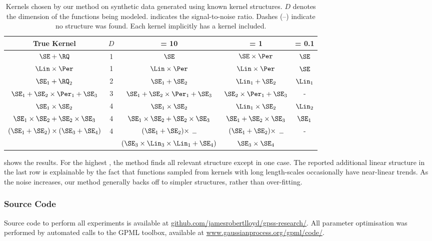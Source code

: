\begin{table}[ht!]
\caption[Kernels recovered on synthetic data]
{
Kernels chosen by our method on synthetic data generated using known kernel structures. $D$ denotes the dimension of the functions being modeled.
\SNR{} indicates the signal-to-noise ratio.
Dashes (--) indicate no structure was found.
Each kernel implicitly has a \kWN{} kernel included.
}
\label{tbl:synthetic}
\begin{center}
{\small
\begin{tabular}{c c | c c c}
True Kernel & $D$ & \SNR{} = 10 & \SNR{} = 1 & \hspace{-1cm} \SNR{} = 0.1 \\
\hline
$\SE + \RQ$        & 1 & $\SE$ & $\SE \times \Per$ & $\SE$ \\
$\Lin \times \Per$ & 1 & $\Lin \times \Per$ & $\Lin \times \Per$ & $\SE$ \\
$\SE_1 + \RQ_2$    & 2 & $\SE_1 + \SE_2$ & $\Lin_1 + \SE_2$ & $\Lin_1$ \\
$\SE_1 + \SE_2 \times \Per_1 + \SE_3$ & 3 & $\SE_1 + \SE_2 \times \Per_1 + \SE_3$ & $\SE_2 \times \Per_1 + \SE_3$ & - \\
$\SE_1 \times \SE_2$ & 4 & $\SE_1 \times \SE_2$ & $\Lin_1 \times \SE_2$ & $\Lin_2$ \\
$\SE_1 \times \SE_2 + \SE_2 \times \SE_3$ & 4 & $\SE_1 \times \SE_2 + \SE_2 \times \SE_3$ & $\SE_1 + \SE_2 \times \SE_3$ & $\SE_1$ \\
\multirow{2}{*}{ $(\SE_1 + \SE_2) \times (\SE_3 + \SE_4)$ } & \multirow{2}{*}{4} & $(\SE_1 + \SE_2) \times$ \dots & $(\SE_1 + \SE_2) \times$ \dots & \multirow{2}{*}{-} \\
 & & $(\SE_3\times\Lin_3\times\Lin_1 + \SE_4)$ & $\SE_3 \times \SE_4$ &
\end{tabular}
}
\end{center}
\end{table}


 shows the results.
For the highest \SNR{}, the method finds all relevant structure except in one case.
The reported additional linear structure in the last row is explainable by the fact that functions sampled from \kSE{} kernels with long length-scales occasionally have near-linear trends.
As the noise increases, our method generally backs off to simpler structures, rather than over-fitting.

\subsubsection{Source Code}
Source code to perform all experiments is available at \url{github.com/jamesrobertlloyd/gpss-research/}. 
All \gp{} parameter optimisation was performed by automated calls to the GPML toolbox, available at \url{www.gaussianprocess.org/gpml/code/}.


